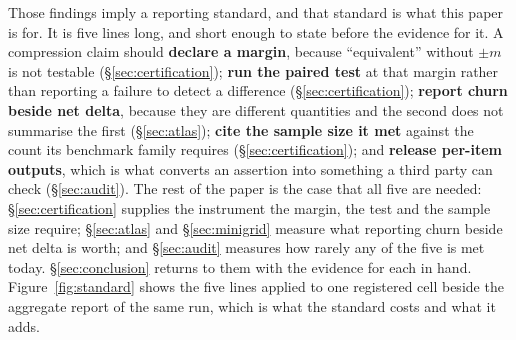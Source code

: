 Those findings imply a reporting standard, and that standard is what this paper
is for. It is five lines long, and short enough to state before the evidence for
it. A compression claim should \textbf{declare a margin},
because ``equivalent'' without $\pm m$ is not testable
(\S\ref{sec:certification}); \textbf{run the paired test} at that margin rather
than reporting a failure to detect a difference (\S\ref{sec:certification});
\textbf{report churn beside net delta}, because they are different quantities
and the second does not summarise the first (\S\ref{sec:atlas});
\textbf{cite the sample size it met} against the count its benchmark family
requires (\S\ref{sec:certification}); and \textbf{release per-item outputs},
which is what converts an assertion into something a third party can check
(\S\ref{sec:audit}). The rest of the paper is the case that all five are needed:
\S\ref{sec:certification} supplies the instrument the margin, the test and the
sample size require; \S\ref{sec:atlas} and \S\ref{sec:minigrid} measure what
reporting churn beside net delta is worth; and \S\ref{sec:audit} measures how
rarely any of the five is met today. \S\ref{sec:conclusion} returns to them with
the evidence for each in hand.
Figure~\ref{fig:standard} shows the five lines applied to one registered cell
beside the aggregate report of the same run, which is what the standard costs
and what it adds.

